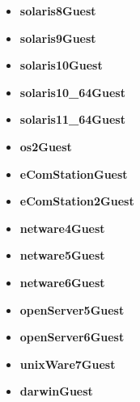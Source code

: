 \begin{itemize}
\item \textbf{solaris8Guest} 
\end{itemize}
\begin{itemize}
\item \textbf{solaris9Guest} 
\end{itemize}
\begin{itemize}
\item \textbf{solaris10Guest} 
\end{itemize}
\begin{itemize}
\item \textbf{solaris10\_64Guest} 
\end{itemize}
\begin{itemize}
\item \textbf{solaris11\_64Guest} 
\end{itemize}
\begin{itemize}
\item \textbf{os2Guest} 
\end{itemize}
\begin{itemize}
\item \textbf{eComStationGuest} 
\end{itemize}
\begin{itemize}
\item \textbf{eComStation2Guest} 
\end{itemize}
\begin{itemize}
\item \textbf{netware4Guest} 
\end{itemize}
\begin{itemize}
\item \textbf{netware5Guest} 
\end{itemize}
\begin{itemize}
\item \textbf{netware6Guest} 
\end{itemize}
\begin{itemize}
\item \textbf{openServer5Guest} 
\end{itemize}
\begin{itemize}
\item \textbf{openServer6Guest} 
\end{itemize}
\begin{itemize}
\item \textbf{unixWare7Guest} 
\end{itemize}
\begin{itemize}
\item \textbf{darwinGuest} 
\end{itemize}
